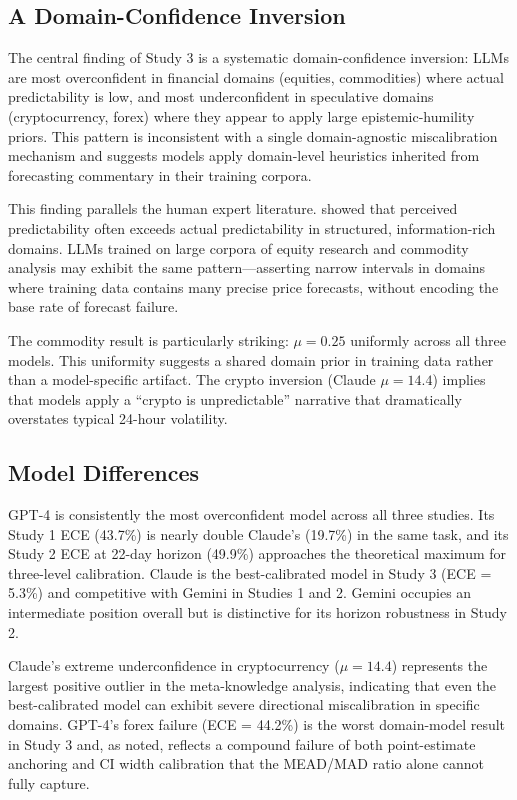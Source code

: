 \subsection{A Domain-Confidence Inversion}
\label{sec:discussion-domain}

The central finding of Study 3 is a systematic domain-confidence inversion: LLMs are
most overconfident in financial domains (equities, commodities) where actual
predictability is low, and most underconfident in speculative domains (cryptocurrency,
forex) where they appear to apply large epistemic-humility priors. This pattern is
inconsistent with a single domain-agnostic miscalibration mechanism and suggests
models apply domain-level heuristics inherited from forecasting commentary in their
training corpora.

This finding parallels the human expert literature. \citet{Griffin1992} showed that
perceived predictability often exceeds actual predictability in structured,
information-rich domains. LLMs trained on large corpora of equity research and
commodity analysis may exhibit the same pattern---asserting narrow intervals in domains
where training data contains many precise price forecasts, without encoding the base
rate of forecast failure.

The commodity result is particularly striking: $\mu = 0.25$ uniformly across all three
models. This uniformity suggests a shared domain prior in training data rather than a
model-specific artifact. The crypto inversion (Claude $\mu = 14.4$) implies that models
apply a ``crypto is unpredictable'' narrative that dramatically overstates typical
24-hour volatility.

\subsection{Model Differences}
\label{sec:discussion-models}

GPT-4 is consistently the most overconfident model across all three studies. Its Study
1 ECE (43.7\%) is nearly double Claude's (19.7\%) in the same task, and its Study 2
ECE at 22-day horizon (49.9\%) approaches the theoretical maximum for three-level
calibration. Claude is the best-calibrated model in Study 3 (ECE = 5.3\%) and
competitive with Gemini in Studies 1 and 2. Gemini occupies an intermediate position
overall but is distinctive for its horizon robustness in Study 2.

Claude's extreme underconfidence in cryptocurrency ($\mu = 14.4$) represents the
largest positive outlier in the meta-knowledge analysis, indicating that even the
best-calibrated model can exhibit severe directional miscalibration in specific domains.
GPT-4's forex failure (ECE = 44.2\%) is the worst domain-model result in Study 3 and,
as noted, reflects a compound failure of both point-estimate anchoring and CI width
calibration that the MEAD/MAD ratio alone cannot fully capture.

